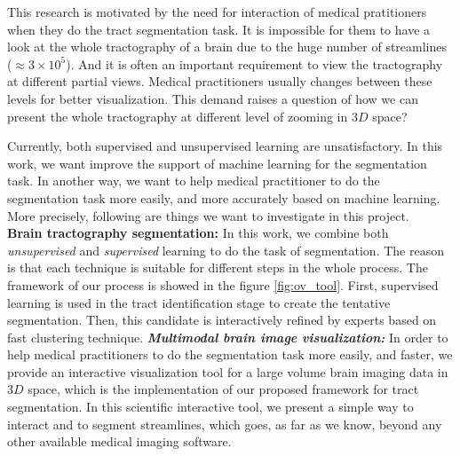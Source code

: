 This research is motivated by the need for interaction of medical pratitioners when they do the tract segmentation task. It is impossible for them to have a look at the whole tractography of a brain due to the huge number of streamlines ($\approx 3 \times 10^5$). And it is often an important requirement to view the tractography at different partial views. Medical practitioners usually changes between these levels for better visualization. This demand raises a question of how we can present the whole tractography at different level of zooming in $3D$ space? 

Currently, both supervised and unsupervised learning are unsatisfactory. In this work, we want improve the support of machine learning for the segmentation task. In another way, we want to help medical practitioner to do the segmentation task more easily, and more accurately based on machine learning. More precisely, following are things we want to investigate in this project.
\\\textbf{Brain tractography segmentation:} In %
this work, we combine both \textit{unsupervised} and \textit{supervised} learning to do the task of segmentation. The reason is that each technique is suitable for different steps in the whole process. The framework of our process is showed in the figure \ref{fig:ov_tool}. First, supervised learning is used in the tract identification stage to create the tentative segmentation. Then, this candidate is interactively refined by experts based on fast clustering technique.
\textbf{\textit{Multimodal brain image visualization:}} In order to help medical practitioners to do the segmentation task more easily, and faster, we provide an interactive visualization tool for a large volume brain imaging data in $3D$ space, which is the implementation of our proposed framework for tract segmentation. In this scientific interactive tool, we present a simple way to interact and to segment streamlines, which goes, as far as we know, beyond any other available medical imaging software.
